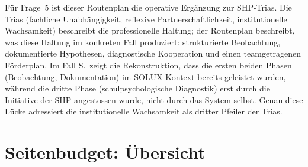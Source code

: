 \documentclass[ngerman, a4paper]{article}
\begin{document}
Für Frage~5 ist dieser Routenplan die operative Ergänzung zur SHP-Trias. Die
Trias (fachliche Unabhängigkeit, reflexive Partnerschaftlichkeit,
institutionelle Wachsamkeit) beschreibt die professionelle Haltung; der
Routenplan beschreibt, was diese Haltung im konkreten Fall produziert:
strukturierte Beobachtung, dokumentierte Hypothesen, diagnostische Kooperation
und einen teamgetragenen Förderplan. Im Fall S.\ zeigt die Rekonstruktion, dass
die ersten beiden Phasen (Beobachtung, Dokumentation) im SOLUX-Kontext bereits
geleistet wurden, während die dritte Phase (schulpsychologische Diagnostik)
erst durch die Initiative der SHP angestossen wurde, nicht durch das System
selbst. Genau diese Lücke adressiert die institutionelle Wachsamkeit als
dritter Pfeiler der Trias.


\section*{Seitenbudget: Übersicht}


\newpage

\printbibliography[title={Literaturverzeichnis}]
\end{document}
